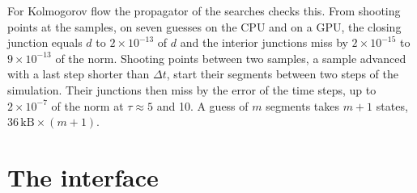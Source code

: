\documentclass[11pt]{article}
\begin{document}
For Kolmogorov flow the propagator of the searches checks this. From shooting points at the samples, on seven guesses on the CPU and on a GPU, the closing junction equals $d$ to $2 \times 10^{-13}$ of $d$ and the interior junctions miss by $2 \times 10^{-15}$ to $9 \times 10^{-13}$ of the norm. Shooting points between two samples, a sample advanced with a last step shorter than $\Delta t$, start their segments between two steps of the simulation. Their junctions then miss by the error of the time steps, up to $2 \times 10^{-7}$ of the norm at $\tau \approx 5$ and 10. A guess of $m$ segments takes $m + 1$ states, $36\,\mathrm{kB} \times (m + 1)$.

\section{The interface}
\end{document}
